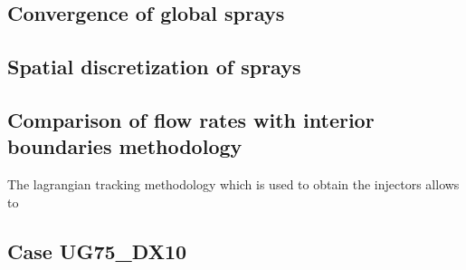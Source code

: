 \subsection{Convergence of global sprays}


\subsection{Spatial discretization of sprays}

\subsection{Comparison of flow rates with interior boundaries methodology}

The lagrangian tracking methodology which is used to obtain the injectors allows to 

\clearpage

\subsection*{Case UG75\_DX10}





